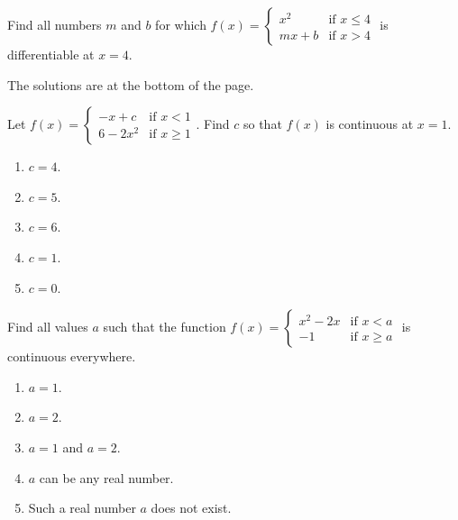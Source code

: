 \documentclass[../main.tex]{subfiles}
\begin{document}
\begin{example} \label{eg:find-all-blah-differentiability}
  Find all numbers \(m\) and \(b\) for which \(f(x) = \begin{cases} x^{2} &\text{if } x \le 4 \\ mx + b &\text{if } x > 4 \end{cases}\) is differentiable at \(x = 4\).

\end{example}

\clearpage

The solutions are at the bottom of the page.

\begin{exercise}
  Let \(f(x) = \begin{cases} - x + c &\text{if } x < 1 \\ 6 - 2x^{2} &\text{if } x \ge 1 \end{cases}\). Find \(c\) so that \(f(x)\) is continuous at \(x = 1\).

  \begin{enumerate}[label=\Alph*.]
    \item \(c = 4\).
    \item \(c = 5\).
    \item \(c = 6\).
    \item \(c = 1\).
    \item \(c = 0\).
  \end{enumerate}
\end{exercise}
\vfill{}

\begin{exercise}
  Find all values \(a\) such that the function \(f(x) = \begin{cases} x^{2} - 2x &\text{if } x < a \\ -1 &\text{if } x \ge a \end{cases}\) is continuous everywhere.

  \begin{enumerate}[label=\Alph*.]
    \item \(a = 1\).
    \item \(a = 2\).
    \item \(a = 1\) and \(a = 2\).
    \item \(a\) can be any real number.
    \item Such a real number \(a\) does not exist.
  \end{enumerate}
\end{exercise}
\vfill{}
\end{document}
